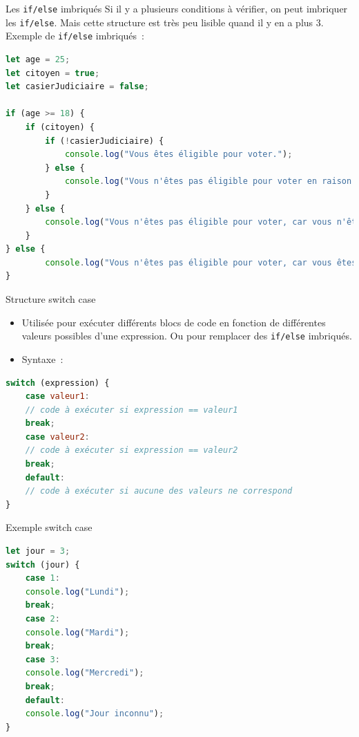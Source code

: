 \documentclass{beamer}
\begin{document}
\begin{frame}[fragile]{Les \lstinline{if/else} imbriqués}
    Si il y a plusieurs conditions à vérifier, on peut imbriquer les \lstinline{if/else}.
    \bigbreak
    Mais cette structure est très peu lisible quand il y en a plus 3.
    Exemple de \lstinline{if/else} imbriqués~:
    \begin{lstlisting}[language=JavaScript,title={\scriptsize{Script JavaScript}},basicstyle=\tiny\ttfamily]
let age = 25;
let citoyen = true;
let casierJudiciaire = false;

if (age >= 18) {
    if (citoyen) {
        if (!casierJudiciaire) {
            console.log("Vous êtes éligible pour voter.");
        } else {
            console.log("Vous n'êtes pas éligible pour voter en raison de votre casier judiciaire.");
        }
    } else {
        console.log("Vous n'êtes pas éligible pour voter, car vous n'êtes pas citoyen.");
    }
} else {
        console.log("Vous n'êtes pas éligible pour voter, car vous êtes mineur.");
}
    \end{lstlisting}
\end{frame}

\begin{frame}[fragile]{Structure switch case}
    \begin{itemize}
        \item Utilisée pour exécuter différents blocs de code en fonction de différentes
              valeurs possibles d'une expression. Ou pour remplacer des \lstinline{if/else}
              imbriqués.
        \item Syntaxe~:
    \end{itemize}
    \begin{lstlisting}[language=JavaScript,title={\scriptsize{Script JavaScript}}]
switch (expression) {
    case valeur1:
    // code à exécuter si expression == valeur1
    break;
    case valeur2:
    // code à exécuter si expression == valeur2
    break;
    default:
    // code à exécuter si aucune des valeurs ne correspond
}
    \end{lstlisting}
\end{frame}

\begin{frame}[fragile]{Exemple switch case}
    \begin{lstlisting}[language=JavaScript,title={\scriptsize{Script JavaScript}}]
let jour = 3;
switch (jour) {
    case 1:
    console.log("Lundi");
    break;
    case 2:
    console.log("Mardi");
    break;
    case 3:
    console.log("Mercredi");
    break;
    default:
    console.log("Jour inconnu");
}
    \end{lstlisting}
\end{frame}
\end{document}
